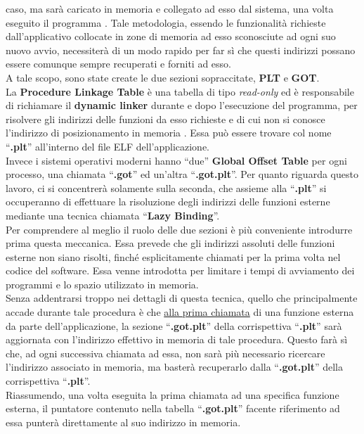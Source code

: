 caso, ma sarà caricato in memoria e collegato ad esso dal sistema, una volta eseguito il programma \cite*{PLT-GOT}. Tale metodologia, essendo le funzionalità richieste dall'applicativo collocate in zone di memoria ad esso sconosciute ad ogni suo nuovo avvio, necessiterà di un modo rapido per far sì che questi indirizzi possano essere comunque sempre recuperati e forniti ad esso.\\
A tale scopo, sono state create le due sezioni sopraccitate, \textbf{PLT} e \textbf{GOT}.\\
La \textbf{Procedure Linkage Table} è una tabella di tipo \textit{read-only} ed è responsabile di richiamare il \textbf{dynamic linker} durante e dopo l'esecuzione del programma, per risolvere gli indirizzi delle funzioni da esso richieste e di cui non si conosce l'indirizzo di posizionamento in memoria \cite*{PLT-GOT-OVERWRITE}. Essa può essere trovare col nome ``\textbf{.plt}'' all'interno del file ELF dell'applicazione.\\
Invece i sistemi operativi moderni hanno ``due'' \textbf{Global Offset Table} per ogni processo, una chiamata ``\textbf{.got}'' ed un'altra ``\textbf{.got.plt}''. Per quanto riguarda questo lavoro, ci si concentrerà solamente sulla seconda, che assieme alla ``\textbf{.plt}'' si occuperanno di effettuare la risoluzione degli indirizzi delle funzioni esterne mediante una tecnica chiamata ``\textbf{Lazy Binding}''.\\
Per comprendere al meglio il ruolo delle due sezioni è più conveniente introdurre prima questa meccanica. Essa prevede che gli indirizzi assoluti delle funzioni esterne non siano risolti, finché esplicitamente chiamati per la prima volta nel codice del software. Essa venne introdotta per limitare i tempi di avviamento dei programmi e lo spazio utilizzato in memoria.\cite*{PLT-GOT-WORKS}\\
Senza addentrarsi troppo nei dettagli di questa tecnica, quello che principalmente accade durante tale procedura è che \underline{alla prima chiamata} di una funzione esterna da parte dell'applicazione, la sezione ``\textbf{.got.plt}'' della corrispettiva ``\textbf{.plt}'' sarà aggiornata con l'indirizzo effettivo in memoria di tale procedura. Questo farà sì che, ad ogni successiva chiamata ad essa, non sarà più necessario ricercare l'indirizzo associato in memoria, ma basterà recuperarlo dalla ``\textbf{.got.plt}'' della 
corrispettiva ``\textbf{.plt}''.\\
Riassumendo, una volta eseguita la prima chiamata ad una specifica funzione esterna, il puntatore contenuto nella tabella ``\textbf{.got.plt}'' facente riferimento ad essa punterà direttamente al suo indirizzo in memoria.\\
